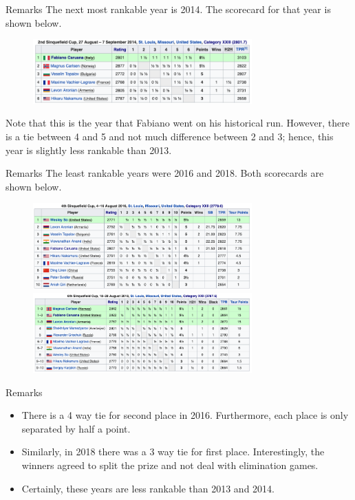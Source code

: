 \documentclass{beamer}
\begin{document}
\begin{frame}{Remarks}
The next most rankable year is 2014.
The scorecard for that year is shown below.
\vfill
\begin{figure}[H]
\centering
\includegraphics[width=0.75\textwidth]{figures/SinquefieldCup2014}
\end{figure}
\vfill
Note that this is the year that Fabiano went on his historical run.
However, there is a tie between 4 and 5 and not much difference between 2 and 3; hence, this year is slightly less rankable than 2013.
\end{frame}

\begin{frame}{Remarks}
The least rankable years were 2016 and 2018. 
Both scorecards are shown below.
\vfill
\begin{figure}[H]
\centering
\includegraphics[width=0.75\textwidth]{figures/SinquefieldCup2016} \\
\includegraphics[width=0.75\textwidth]{figures/SinquefieldCup2018}
\end{figure}
\end{frame}

\begin{frame}{Remarks}
\begin{itemize}
\item	There is a 4 way tie for second place in 2016.
	 Furthermore, each place is only separated by half a point.
\vfill
\item Similarly, in 2018 there was a 3 way tie for first place. 
	Interestingly, the winners agreed to split the prize and not deal with elimination games.
\vfill
\item	Certainly, these years are less rankable than 2013 and 2014.
\end{itemize}
\end{frame}
\end{document}
